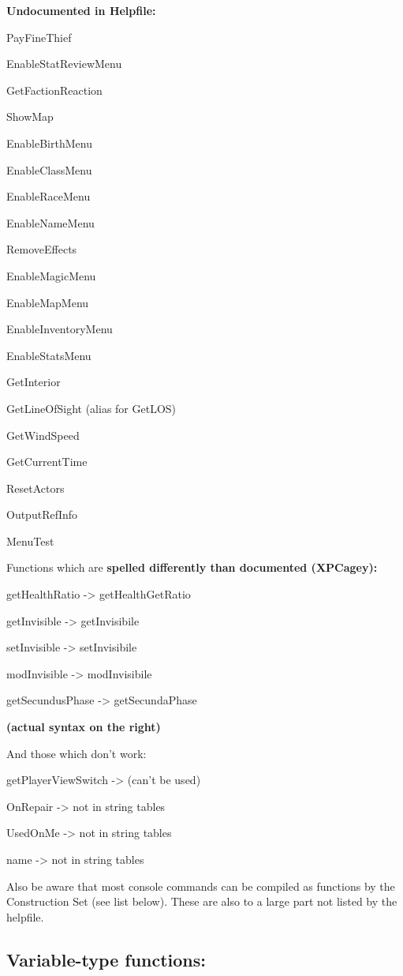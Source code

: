 \textbf{Undocumented in Helpfile:}

PayFineThief

EnableStatReviewMenu

GetFactionReaction

ShowMap

EnableBirthMenu

EnableClassMenu

EnableRaceMenu

EnableNameMenu

RemoveEffects

EnableMagicMenu

EnableMapMenu

EnableInventoryMenu

EnableStatsMenu

GetInterior

GetLineOfSight (alias for GetLOS)

GetWindSpeed

GetCurrentTime

ResetActors

OutputRefInfo

MenuTest

Functions which are \textbf{spelled differently than documented
(XPCagey):}

getHealthRatio -\textgreater{} getHealthGetRatio

getInvisible -\textgreater{} getInvisibile

setInvisible -\textgreater{} setInvisibile

modInvisible -\textgreater{} modInvisibile

getSecundusPhase -\textgreater{} getSecundaPhase

\textbf{(actual syntax on the right)}

And those which don't work:

getPlayerViewSwitch -\textgreater{} (can't be used)

OnRepair -\textgreater{} not in string tables

UsedOnMe -\textgreater{} not in string tables

name -\textgreater{} not in string tables

Also be aware that most console commands can be compiled as functions by
the Construction Set (see list below). These are also to a large part
not listed by the helpfile.

\hypertarget{variable-type-functions}{%
\subsection{\texorpdfstring{\hfill\break
Variable-type
functions:}{ Variable-type functions:}}\label{variable-type-functions}}


